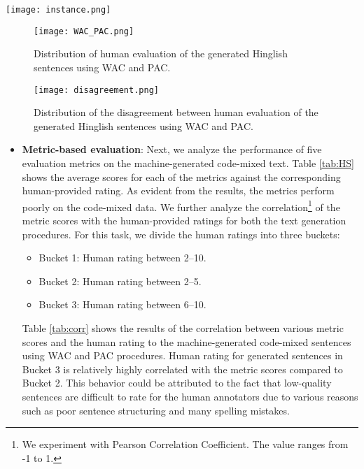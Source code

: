 \documentclass[11pt]{article}
\begin{document}
\begin{table*}[!tbh]
\centering
    \texttt{[image: instance.png]}
\caption{Example human-generated and machine-generated Hinglish sentences from the dataset along with the source English and Hindi sentences. Two different human annotators rate the synthetic Hinglish sentences on the scale 1-10 (low-high quality}
\label{fig:instance}
\end{table*}


\begin{figure}[!tbh]
\centering
    \texttt{[image: WAC\_PAC.png]}
\caption{Distribution of human evaluation of the generated Hinglish sentences using WAC and PAC.}
\label{fig:ratings}
\end{figure}

\begin{figure}[!tbh]
\centering
    \texttt{[image: disagreement.png]}
\caption{Distribution of the disagreement between human evaluation of the generated Hinglish sentences using WAC and PAC.}
\label{fig:disagreement}
\end{figure}

\begin{itemize}[noitemsep,nolistsep]
    \item \textbf{Metric-based evaluation}: Next, we analyze the performance of five evaluation metrics on the machine-generated code-mixed text. Table \ref{tab:HS} shows the average scores for each of the metrics against the corresponding human-provided rating. As evident from the results, the metrics perform poorly on the code-mixed data. We further analyze the correlation\footnote{We experiment with Pearson Correlation Coefficient. The value ranges from -1 to 1.} of the metric scores with the human-provided ratings for both the text generation procedures. For this task, we divide the human ratings into three buckets:
    \begin{itemize}[noitemsep,nolistsep]
        \item Bucket 1: Human rating between 2--10.
        \item Bucket 2: Human rating between 2--5.
        \item Bucket 3: Human rating between 6--10.
    \end{itemize}
    
    Table \ref{tab:corr} shows the results of the correlation between various metric scores and the human rating to the machine-generated code-mixed sentences using WAC and PAC procedures. Human rating for generated sentences in Bucket 3 is relatively highly correlated with the metric scores compared to Bucket 2. This behavior could be attributed to the fact that low-quality sentences are difficult to rate for the human annotators due to various reasons such as poor sentence structuring and many spelling mistakes.
\end{itemize}
\end{document}
